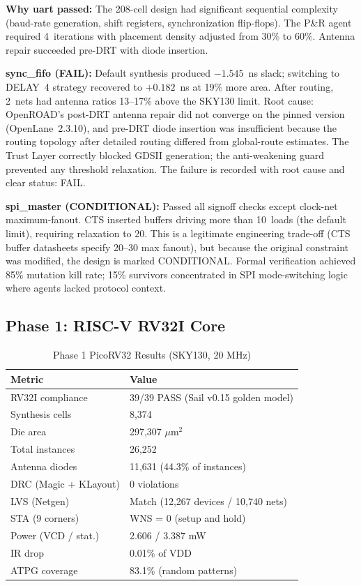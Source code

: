 \documentclass[journal]{IEEEtran}
\begin{document}
\textbf{Why uart passed:} The 208-cell design had significant sequential complexity (baud-rate generation, shift registers, synchronization flip-flops). The P\&R agent required 4~iterations with placement density adjusted from 30\% to 60\%. Antenna repair succeeded pre-DRT with diode insertion.

\textbf{sync\_fifo (FAIL):} Default synthesis produced $-1.545$~ns slack; switching to DELAY~4 strategy recovered to $+0.182$~ns at 19\% more area. After routing, 2~nets had antenna ratios 13--17\% above the SKY130 limit. Root cause: OpenROAD's post-DRT antenna repair did not converge on the pinned version (OpenLane~2.3.10), and pre-DRT diode insertion was insufficient because the routing topology after detailed routing differed from global-route estimates. The Trust Layer correctly blocked GDSII generation; the anti-weakening guard prevented any threshold relaxation. The failure is recorded with root cause and clear status: FAIL.

\textbf{spi\_master (CONDITIONAL):} Passed all signoff checks except clock-net maximum-fanout. CTS inserted buffers driving more than 10~loads (the default limit), requiring relaxation to 20. This is a legitimate engineering trade-off (CTS buffer datasheets specify 20--30 max fanout), but because the original constraint was modified, the design is marked CONDITIONAL. Formal verification achieved 85\% mutation kill rate; 15\% survivors concentrated in SPI mode-switching logic where agents lacked protocol context.

\subsection{Phase 1: RISC-V RV32I Core}

\begin{table}[t]
\centering
\caption{Phase 1 PicoRV32 Results (SKY130, 20 MHz)}
\label{tab:phase1}
\begin{tabular}{@{}ll@{}}
\toprule
\textbf{Metric} & \textbf{Value} \\
\midrule
RV32I compliance & 39/39 PASS (Sail v0.15 golden model) \\
Synthesis cells & 8,374 \\
Die area & 297,307 $\mu$m$^2$ \\
Total instances & 26,252 \\
Antenna diodes & 11,631 (44.3\% of instances) \\
DRC (Magic + KLayout) & 0 violations \\
LVS (Netgen) & Match (12,267 devices / 10,740 nets) \\
STA (9 corners) & WNS = 0 (setup and hold) \\
Power (VCD / stat.) & 2.606 / 3.387 mW \\
IR drop & 0.01\% of VDD \\
ATPG coverage & 83.1\% (random patterns) \\
\bottomrule
\end{tabular}
\end{table}
\end{document}
